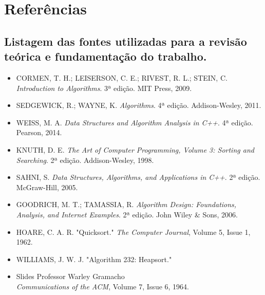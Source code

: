 \documentclass[a4paper,12pt]{article}
\begin{document}
\section{Referências}
\subsection{Listagem das fontes utilizadas para a revisão teórica e fundamentação do trabalho.}

\begin{itemize}
    \item CORMEN, T. H.; LEISERSON, C. E.; RIVEST, R. L.; STEIN, C. \textit{Introduction to Algorithms}. 3ª edição. MIT Press, 2009.
    \item SEDGEWICK, R.; WAYNE, K. \textit{Algorithms}. 4ª edição. Addison-Wesley, 2011.
    \item WEISS, M. A. \textit{Data Structures and Algorithm Analysis in C++}. 4ª edição. Pearson, 2014.
    \item KNUTH, D. E. \textit{The Art of Computer Programming, Volume 3: Sorting and Searching}. 2ª edição. Addison-Wesley, 1998.
    \item SAHNI, S. \textit{Data Structures, Algorithms, and Applications in C++}. 2ª edição. McGraw-Hill, 2005.
    \item GOODRICH, M. T.; TAMASSIA, R. \textit{Algorithm Design: Foundations, Analysis, and Internet Examples}. 2ª edição. John Wiley \& Sons, 2006.
    \item HOARE, C. A. R. "Quicksort." \textit{The Computer Journal}, Volume 5, Issue 1, 1962.
    \item WILLIAMS, J. W. J. "Algorithm 232: Heapsort." 
    \item Slides Professor Warley Gramacho\\
    \textit{Communications of the ACM}, Volume 7, Issue 6, 1964.
\end{itemize}
\end{document}
